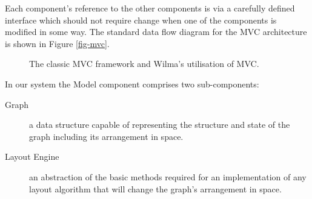\documentclass[runningheads]{cl2emult}
\begin{document}
Each component's reference to
the other components is via a carefully defined interface which should
not require change when one of the components is modified in some way.  The
standard data flow diagram for the MVC architecture is shown in Figure
\ref{fig-mvc}.

\begin{figure}[h]
  \centering
  \caption{The classic MVC framework and Wilma's utilisation of MVC.}
\end{figure}

In our system the Model component comprises two sub-components:
\begin{description}
\item[Graph] a data structure capable of representing the structure
and state of the graph including its arrangement in space.
\item[Layout Engine] an abstraction of the basic methods required for
an implementation of any layout algorithm that will change the graph's
arrangement in space.
\end{description}
\end{document}
